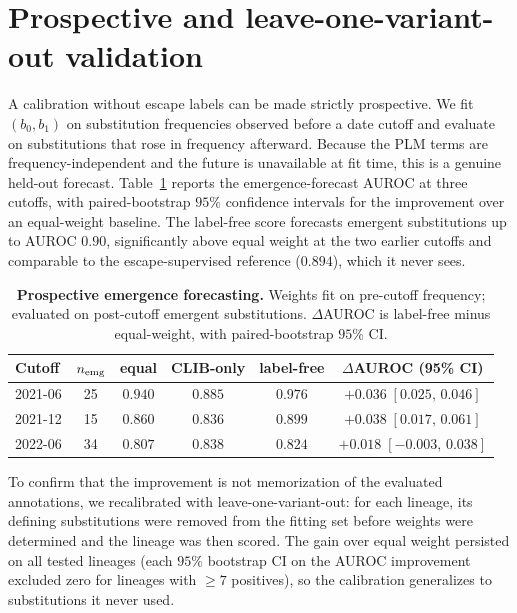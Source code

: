\documentclass{article}
\numberwithin{theorem}{section}
\begin{document}
\section{Prospective and leave-one-variant-out validation}

A calibration without escape labels can be made strictly prospective. We fit
$(b_0,b_1)$ on substitution frequencies observed before a date cutoff and evaluate
on substitutions that rose in frequency afterward. Because the PLM terms are
frequency-independent and the future is unavailable at fit time, this is a genuine
held-out forecast. Table~\ref{tab:supp-temporal} reports the emergence-forecast
AUROC at three cutoffs, with paired-bootstrap $95\%$ confidence intervals for the
improvement over an equal-weight baseline. The label-free score forecasts emergent
substitutions up to AUROC $0.90$, significantly above equal weight at the two
earlier cutoffs and comparable to the escape-supervised reference ($0.894$), which
it never sees.

\begin{table}[htbp]
    \centering
    \caption{\textbf{Prospective emergence forecasting.} Weights fit on pre-cutoff
    frequency; evaluated on post-cutoff emergent substitutions. $\Delta$AUROC is
    label-free minus equal-weight, with paired-bootstrap $95\%$ CI.}
    \begin{tabular}{l|c|ccc|c}
        \toprule
        Cutoff & $n_{\rm emg}$ & equal & CLIB-only & label-free & $\Delta$AUROC (95\% CI) \\
        \midrule
        2021-06 & 25 & $0.940$ & $0.885$ & $0.976$ & $+0.036\;[0.025,\,0.046]$ \\
        2021-12 & 15 & $0.860$ & $0.836$ & $0.899$ & $+0.038\;[0.017,\,0.061]$ \\
        2022-06 & 34 & $0.807$ & $0.838$ & $0.824$ & $+0.018\;[-0.003,\,0.038]$ \\
        \bottomrule
    \end{tabular}
    \label{tab:supp-temporal}
\end{table}

To confirm that the improvement is not memorization of the evaluated annotations,
we recalibrated with leave-one-variant-out: for each lineage, its defining
substitutions were removed from the fitting set before weights were determined and
the lineage was then scored. The gain over equal weight persisted on all tested
lineages (each $95\%$ bootstrap CI on the AUROC improvement excluded zero for
lineages with $\ge 7$ positives), so the calibration generalizes to substitutions
it never used.
\end{document}
